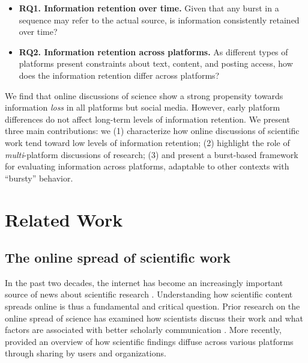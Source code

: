 \documentclass[letterpaper]{article} %
\begin{document}
\begin{itemize}
    \item %
    \textbf{RQ1. Information retention over time.} Given that any burst in a sequence may refer to the actual source, is information consistently retained over time?
    \item %
    \textbf{RQ2. Information retention across platforms.} As different types of platforms present constraints about text, content, and posting access, how does the information retention differ across platforms?
\end{itemize}

We find that online discussions of science show a strong propensity towards information \textit{loss} in all platforms but social media. However, early platform differences do not affect long-term levels of information retention.
We present three main contributions: we (1) characterize how online discussions of scientific work tend toward low levels of information retention; (2) highlight the role of \textit{multi}-platform discussions of research; (3) and present a burst-based framework for evaluating information across platforms, adaptable to other contexts with ``bursty'' behavior.

\section{Related Work}
\subsection{The online spread of scientific work}
In the past two decades, the internet has become an increasingly important source of news about scientific research \citep{brossardNewMediaLandscapes2013,vaneperenHowScientistsUse2011,hargittaiHowYoungAdults2018,nationalscienceboardScienceTechnologyPublic2020}. %
Understanding how scientific content spreads online is thus a fundamental and critical question. Prior research on the online spread of science has examined how scientists discuss their work \cite{robinson-garciaUnbearableEmptinessTweeting2017,reinhardtHowPeopleAre2009} and what factors are associated with better scholarly communication \citep{milkmanScienceSharingSharing2014}. More recently, \citet{zakhlebinDiffusionScientificArticles2020} provided an overview of how scientific findings diffuse across various platforms through sharing by users and organizations.
\end{document}

